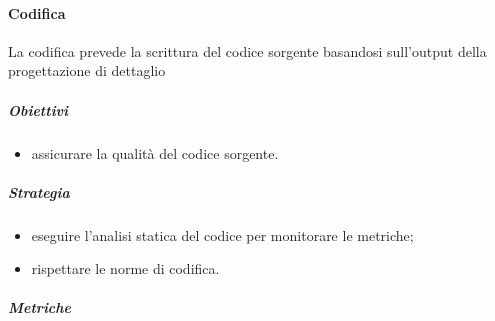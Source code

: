         \paragraph{Codifica}
            La codifica prevede la scrittura del codice sorgente basandosi sull'output della progettazione di dettaglio
            \subparagraph{Obiettivi}
                \begin{itemize}
                    \item assicurare la qualità del codice sorgente.
                \end{itemize}
            \subparagraph{Strategia}
                \begin{itemize}
                    \item eseguire l'analisi statica del codice per monitorare le metriche;
                    \item rispettare le norme di codifica.
                \end{itemize}
            \subparagraph{Metriche}
